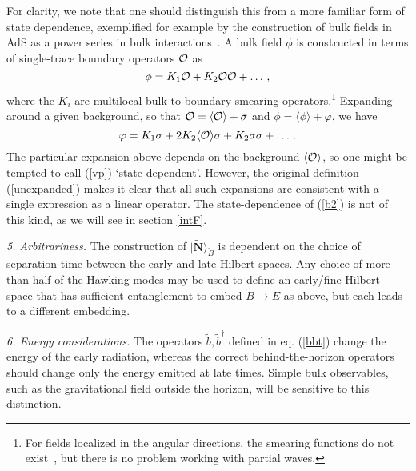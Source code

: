 \documentclass[12pt]{article}
\newcommand{\be}{\begin{equation}}
\newcommand{\ee}{\end{equation}}
\begin{document}
{For clarity, we note that one should distinguish this from a more familiar form of state dependence, exemplified for example by the construction of bulk fields in AdS as a power series in bulk interactions~\cite{Kabat:2011rz,Heemskerk:2012mn}. A bulk field $\phi$ is constructed in terms of single-trace boundary operators ${\cal O}$ as
\be
\label{unexpanded}
\phi = K_1 {\cal O} + K_2 {\cal O}{\cal O}  + \ldots  \,,
\ee
where the $K_i$ are multilocal bulk-to-boundary smearing operators.\footnote{For fields localized in the angular directions, the smearing functions do not exist~\cite{Hamilton:2006fh,Papadodimas:2012aq,Bousso:2012mh}, but there is no problem working with partial waves.}
Expanding around a given background, so that ${\cal O} = \langle {\cal O} \rangle +\sigma$ and
$\phi = \langle \phi \rangle + \varphi$,
we have
\be
\label{vp}
\varphi = K_1 \sigma + 2K_2  \langle {\cal O} \rangle \sigma
+ K_2 \sigma\sigma + \ldots \,.
\ee
The particular expansion above depends on the background $ \langle {\cal O} \rangle$, so one might be tempted to call (\ref{vp}) `state-dependent'. However, the original definition (\ref{unexpanded}) makes it clear that all such expansions are consistent with a single expression as a linear operator. The state-dependence of (\ref{b2}) is not of this kind, as we will see in section \ref{intF}.


{\it 5. Arbitrariness.}  The construction of $|\tilde {\pmb N} \rangle_{\tilde B}$ is dependent on the choice of separation time between the early and late Hilbert spaces.  Any choice of more than half of the Hawking modes may be used to define an early/fine Hilbert space that has sufficient entanglement to embed $\tilde B \to E$ as above,  but each leads to a different embedding.

{\it 6. Energy considerations.} The operators $\tilde{b},\tilde{b}^\dagger$ defined in eq. (\ref{bbt}) change the energy of the early radiation, whereas the correct behind-the-horizon operators should change only the energy emitted at late times. Simple bulk observables, such as the gravitational field outside the horizon, will be sensitive to this distinction.

}
\end{document}
